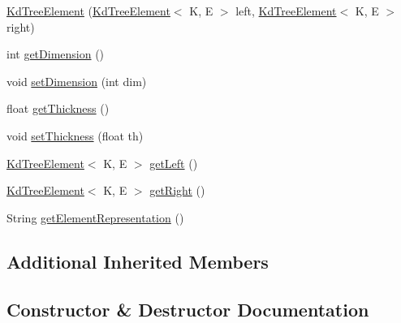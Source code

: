 \begin{DoxyCompactItemize}
\item 
\mbox{\hyperlink{classbridges_1_1base_1_1_kd_tree_element_ad8cd8e37105af65a6ae06e743be9aebe}{Kd\+Tree\+Element}} (\mbox{\hyperlink{classbridges_1_1base_1_1_kd_tree_element}{Kd\+Tree\+Element}}$<$ K, E $>$ left, \mbox{\hyperlink{classbridges_1_1base_1_1_kd_tree_element}{Kd\+Tree\+Element}}$<$ K, E $>$ right)
\item 
int \mbox{\hyperlink{classbridges_1_1base_1_1_kd_tree_element_a2469fcfe38e921ae48338ef1fd347c4a}{get\+Dimension}} ()
\item 
void \mbox{\hyperlink{classbridges_1_1base_1_1_kd_tree_element_af3fa89cbd20fc2c3f30784db16b6dec4}{set\+Dimension}} (int dim)
\item 
float \mbox{\hyperlink{classbridges_1_1base_1_1_kd_tree_element_a27c0b086af284210855ee5f1c90e7484}{get\+Thickness}} ()
\item 
void \mbox{\hyperlink{classbridges_1_1base_1_1_kd_tree_element_a52412fc59c743a8a0ede057ed2451be9}{set\+Thickness}} (float th)
\item 
\mbox{\hyperlink{classbridges_1_1base_1_1_kd_tree_element}{Kd\+Tree\+Element}}$<$ K, E $>$ \mbox{\hyperlink{classbridges_1_1base_1_1_kd_tree_element_a257367edc8f204c973eb277dcb5d37be}{get\+Left}} ()
\item 
\mbox{\hyperlink{classbridges_1_1base_1_1_kd_tree_element}{Kd\+Tree\+Element}}$<$ K, E $>$ \mbox{\hyperlink{classbridges_1_1base_1_1_kd_tree_element_a990694a36d44aba5f844f1752692c8e6}{get\+Right}} ()
\item 
String \mbox{\hyperlink{classbridges_1_1base_1_1_kd_tree_element_adf9bed8c71a7c257a1359c3c88b808f0}{get\+Element\+Representation}} ()
\end{DoxyCompactItemize}
\subsection*{Additional Inherited Members}


\subsection{Constructor \& Destructor Documentation}
\mbox{\label{classbridges_1_1base_1_1_kd_tree_element_a6acdec52089792d20747c10f56139217}} 

